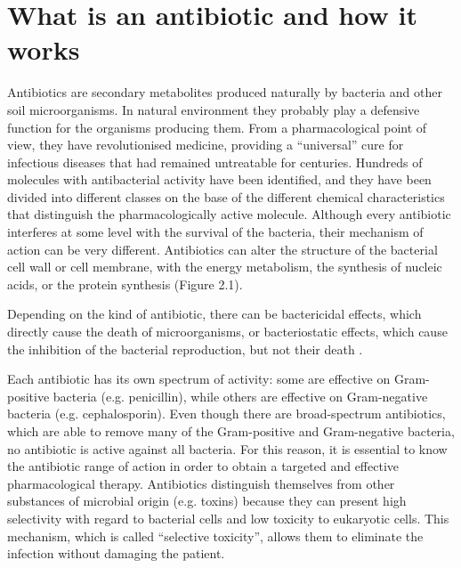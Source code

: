 \documentclass[11pt]{report}
\begin{document}
\chapter{What is an antibiotic and how it works}
Antibiotics are secondary metabolites produced naturally by bacteria and other soil microorganisms.
In natural environment they probably play a defensive function for the organisms producing them.
From a pharmacological point of view, they have revolutionised medicine, providing a “universal” cure for infectious diseases that had remained untreatable for centuries.
Hundreds of molecules with antibacterial activity have been identified, and they have been divided into different classes on the base of the different chemical characteristics that distinguish the pharmacologically active molecule.
Although every antibiotic interferes at some level with the survival of the bacteria, their mechanism of action can be very different.
Antibiotics can alter the structure of the bacterial cell wall or cell membrane, with the energy metabolism, the synthesis of nucleic acids, or the protein synthesis (Figure 2.1).

Depending on the kind of antibiotic, there can be bactericidal effects, which directly cause the death of microorganisms, or bacteriostatic effects, which cause the inhibition of the bacterial reproduction, but not their death \cite{Leekha2011}.

Each antibiotic has its own spectrum of activity: some are effective on Gram-positive bacteria (e.g. penicillin), while others are effective on Gram-negative bacteria (e.g. cephalosporin).
Even though there are broad-spectrum antibiotics, which are able to remove many of the Gram-positive and Gram-negative bacteria, no antibiotic is active against all bacteria.
For this reason, it is essential to know the antibiotic range of action in order to obtain a targeted and effective pharmacological therapy.
Antibiotics distinguish themselves from other substances of microbial origin (e.g. toxins) because they can present high selectivity with regard to bacterial cells and low toxicity to eukaryotic cells.
This mechanism, which is called “selective toxicity”, allows them to eliminate the infection without damaging the patient.
\end{document}
